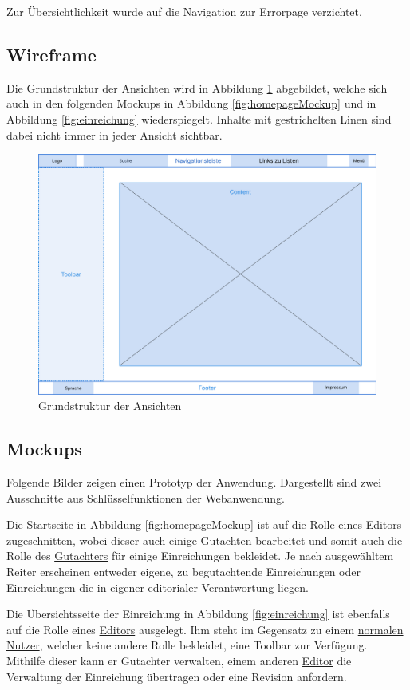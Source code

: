 Zur Übersichtlichkeit wurde auf die Navigation zur Errorpage verzichtet.

\subsection{Wireframe}

Die Grundstruktur der Ansichten wird in Abbildung \ref{fig:wireframe} abgebildet, welche sich auch in den folgenden Mockups in Abbildung \ref{fig:homepageMockup} und in Abbildung \ref{fig:einreichung} wiederspiegelt.
Inhalte mit gestrichelten Linen sind dabei nicht immer in jeder Ansicht sichtbar.

\begin{figure}[H]
	\centering
	\includegraphics[width=0.85\linewidth]{graphics/Wireframe-png}
	\caption{Grundstruktur der Ansichten}
	\label{fig:wireframe}
\end{figure}

\subsection{Mockups}

Folgende Bilder zeigen einen Prototyp der Anwendung.
Dargestellt sind zwei Ausschnitte aus Schlüsselfunktionen der Webanwendung.

Die Startseite in Abbildung \ref{fig:homepageMockup} ist auf die Rolle eines \hyperref[mkrit:editor]{Editors} zugeschnitten, wobei dieser auch einige
Gutachten bearbeitet und somit auch die Rolle des \hyperref[mkrit:gutachter]{Gutachters} für einige Einreichungen bekleidet.
Je nach ausgewähltem Reiter erscheinen entweder eigene, zu begutachtende Einreichungen oder Einreichungen die in eigener editorialer Verantwortung liegen.

Die Übersichtsseite der Einreichung in Abbildung \ref{fig:einreichung} ist ebenfalls auf die Rolle eines \hyperref[mkrit:editor]{Editors} ausgelegt.
Ihm steht im Gegensatz zu einem \hyperref[mkrit:angemeldet]{normalen Nutzer}, welcher keine andere Rolle bekleidet, eine Toolbar zur Verfügung.
Mithilfe dieser kann er Gutachter verwalten, einem anderen \hyperref[mkrit:editor]{Editor} die Verwaltung der Einreichung übertragen oder eine Revision anfordern.



